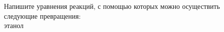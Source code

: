 Напишите уравнения реакций, с помощью которых можно осуществить следующие превращения:\\


этанол            